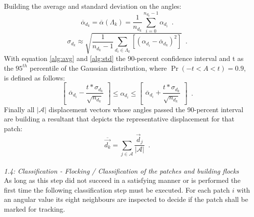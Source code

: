 Building the average and standard deviation on the angles:
\begin{equation}
\label{alg:avg}
\overline{\alpha}_{d_k} = \overline{ \alpha } \left( \Lambda_k \right)  = \frac{1}{n_{d_k}} \sum_{i=0}^{n_{d_k}-1} \alpha_{d_i} \enspace .
\end{equation}
%
\begin{equation}
\label{alg:std}
\sigma_{d_k} \approx \sqrt{ \frac{1}{n_{d_k} - 1} \sum_{d_i \in \Lambda_k} \left[ \left( \alpha_{d_i} - \overline{ \alpha}_{d_k} \right) ^2\right] } \enspace .
\end{equation}
%
With equation \ref{alg:avg} and \ref{alg:std} the 90-percent confidence interval and t as the $95^{th}$ percentile of the Gaussian distribution, where $\Pr\left(-t<A<t\right)=0.9$, is defined as follows:
%
\begin{equation}
\label{confint}
\begin{bmatrix}  \overline{ \alpha}_{d_i} - \dfrac{t*\sigma_{d_k}}{\sqrt {n_{d_k}} } \end{bmatrix} 
\leq \alpha_{d_i} \leq 
\begin{bmatrix} \overline{ \alpha}_{d_i} + \dfrac{t*\sigma_{d_k}}{\sqrt {n_{d_k}} } \end{bmatrix} \enspace .
\end{equation}
%
Finally all $|\mathcal{A}|$ displacement vectors whose angles passed the 90-percent interval are building a resultant that depicts the representative displacement for that patch:
%
\begin{equation}
\label{representative}
\overline{ \vec{d_k }} =  \sum_{j \in \mathcal{A}}{\frac{\vec{d}_j}{|\mathcal{A}|} } \enspace .
\end{equation}
\\ \newline
%
\textit{1.4: Classification - Flocking / Classification of the patches and building flocks} \\ \newline
As long as this step did not succeed in a satisfying manner or is performed the first time the following classification step must be executed. For each patch $i$ with an angular value its eight neighbours are inspected to decide if the patch shall be marked for tracking. 
